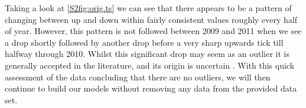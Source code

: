 Taking a look at \autoref{S2fig:orig.ts} we can see that there appears to be a pattern of changing between up and down within fairly consistent values roughly every half of year. However, this pattern is not followed between 2009 and 2011 when we see a drop shortly followed by another drop before a very sharp upwards tick till halfway through 2010. Whilst this significant drop may seem as an outlier it is generally accepted in the literature, and its origin is uncertain \cite{reduction.cite}.
\nline
With this quick assessment of the data concluding that there are no outliers, we will then continue to build our models without removing any data from the provided data set.
